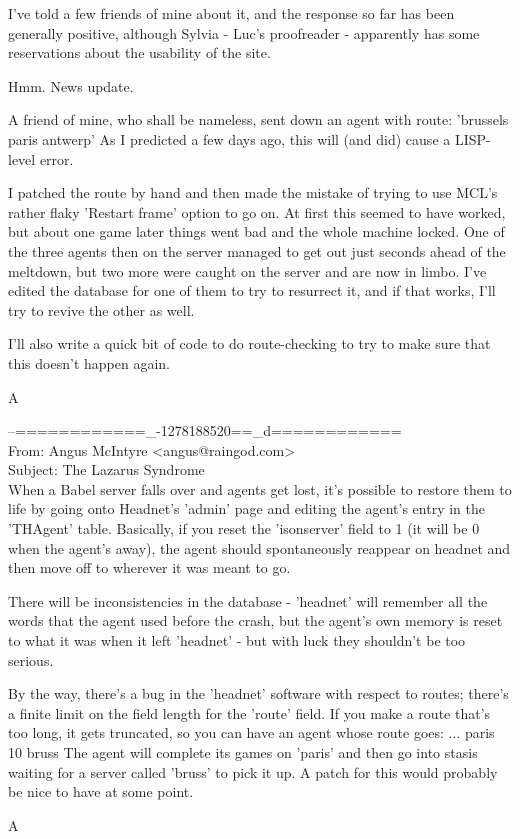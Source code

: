 \begin{mail}
I've told a few friends of mine about it, and the response 
so far has been generally positive, although Sylvia - Luc's 
proofreader - apparently has some reservations about the 
usability of the site.

Hmm. News update.

A friend of mine, who shall be nameless, sent down an agent with route:
	'brussels paris antwerp'
As I predicted a few days ago, this will (and did) cause a 
LISP-level error.

I patched the route by hand and then made the mistake of trying to use 
MCL's rather flaky 'Restart frame' option to go on. At first this seemed 
to have worked, but about one game later things went bad and the whole 
machine locked. One of the three agents then on the server managed to 
get out just seconds ahead of the meltdown, but two more were caught 
on the server and are now in limbo. I've edited the database for one 
of them to try to resurrect it, and if that works, I'll try to 
revive the other as well.

I'll also write a quick bit of code to do route-checking to try 
to make sure that this doesn't happen again.

	A
\end{mail}

\begin{mail}
--============\_-1278188520==\_d============\\
From: Angus McIntyre <angus@raingod.com>\\
Subject: The Lazarus Syndrome\\

When a Babel server falls over and agents get lost, it's possible to 
restore them to life by going onto Headnet's 'admin' page and editing 
the agent's entry in the 'THAgent' table. Basically, if you reset 
the 'isonserver' field to 1 (it will be 0 when the agent's away), 
the agent should spontaneously reappear on headnet and then move 
off to wherever it was meant to go.

There will be inconsistencies in the database - 'headnet' will 
remember all the words that the agent used before the crash, but 
the agent's own memory is reset to what it was when it left 'headnet' - 
but with luck they shouldn't be too serious.

By the way, there's a bug in the 'headnet' software with respect to 
routes; there's a finite limit on the field length for the 'route' 
field. If you make a route that's too long, it gets truncated, so 
you can have an agent whose route goes:
	... paris 10 bruss
The agent will complete its games on 'paris' and then go into 
stasis waiting for a server called 'bruss' to pick it up. A patch 
for this would probably be nice to have at some point.

	A
\end{mail}

